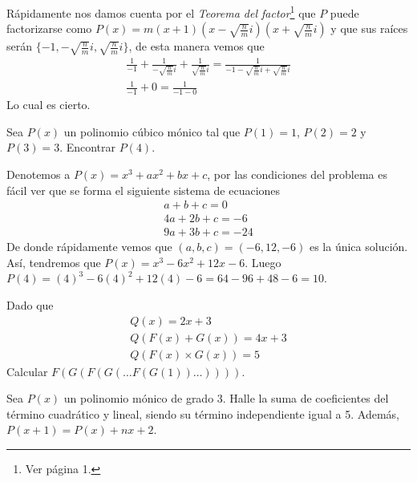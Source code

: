 {\begin{exercise}
        \solution
        {
            Rápidamente nos damos cuenta por el \textit{Teorema del factor}\footnote{Ver \cite{TD23-clase2} página 1.} que
            $P$ puede factorizarse como $P(x) = m(x + 1)(x - \sqrt {\frac{n}{m}}i)(x + \sqrt {\frac{n}{m}}i)$ y
            que sus raíces serán $\{ -1, -\sqrt {\frac{n}{m}}i, \sqrt {\frac{n}{m}}i\}$, de esta manera vemos que
            \begin{gather*}
                \frac{1}{-1} + \frac{1}{-\sqrt {\frac{n}{m}}i} + \frac{1}{\sqrt {\frac{n}{m}}i} = \frac{1}{ -1 - \sqrt {\frac{n}{m}}i + \sqrt {\frac{n}{m}}i}\\
                \frac{1}{-1} + 0 = \frac{1}{ -1 - 0}
            \end{gather*}
            Lo cual es cierto.
        }
    \end{exercise}
    \vspace{2mm}
    \begin{exercise}
        Sea $P(x)$ un polinomio cúbico mónico tal que $P(1) = 1$, $P(2) = 2$ y $P(3) = 3$. Encontrar $P(4).$

        \solution
        {
            Denotemos a $P(x) = x^3 + ax^2 + bx +  c$, por las condiciones del problema es fácil ver que se forma el siguiente sistema de ecuaciones
            \begin{align}
                a + b + c = 0 \\
                4a + 2b + c = -6 \\
                9a + 3b + c = -24
            \end{align}
            De donde rápidamente vemos que $(a, b, c) = (-6, 12, -6)$ es la única solución. Así, tendremos que $P(x) = x^3 - 6x^2 + 12x - 6$.
            Luego $P(4) = (4)^3 - 6(4)^2 + 12(4) - 6 = 64 - 96 + 48 - 6 = 10$.
        }
    \end{exercise}


    \begin{exercise}
        Dado que
        \begin{gather*}
            Q(x) = 2x + 3 \\
            Q( F(x) + G(x) ) = 4x + 3 \\
            Q( F(x) \times G(x) ) = 5
        \end{gather*}
        Calcular $F(G(F(G(\dots F(G(1))\dots))))$.
    \end{exercise}

    \begin{exercise}
        Sea $P(x)$ un polinomio mónico de grado 3. Halle la suma de coeficientes del término cuadrático y lineal, siendo su término independiente igual a 5. Además, $P(x + 1) = P(x) + nx + 2$.
    \end{exercise}

}
